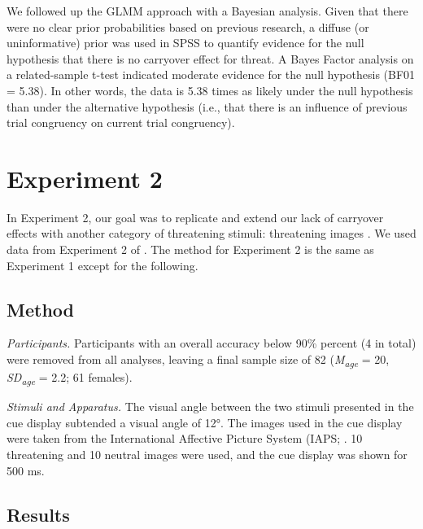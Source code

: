\documentclass{article}
\begin{document}
We followed up the GLMM approach with a Bayesian analysis. Given that there were no clear prior probabilities based on previous research, a diffuse (or uninformative) prior was used in SPSS to quantify evidence for the null hypothesis that there is no carryover effect for threat. A Bayes Factor analysis on a related-sample t-test indicated moderate evidence for the null hypothesis (BF01 = 5.38). In other words, the data is 5.38 times as likely under the null hypothesis than under the alternative hypothesis (i.e., that there is an influence of previous trial congruency on current trial congruency). 

\section{Experiment 2}

\textbf{}In Experiment 2, our goal was to replicate and extend our lack of carryover effects with another category of threatening stimuli: threatening images \parencite{Lang2008}. We used data from Experiment 2 of \parencite{Carlson2020}. The method for Experiment 2 is the same as Experiment 1 except for the following.

\subsection{Method}

\emph{Participants. }Participants with an overall accuracy below 90\% percent (4 in total) were removed from all analyses, leaving a final sample size of 82 (\emph{M}\textsubscript{\emph{age}} = 20, \emph{SD}\textsubscript{\emph{age}} = 2.2; 61 females). 

\emph{Stimuli and Apparatus. }The visual angle between the two stimuli presented in the cue display subtended a visual angle of 12°. The images used in the cue display were taken from the International Affective Picture System (IAPS; \parencite[200][]{Lang2008}. 10 threatening and 10 neutral images were used, and the cue display was shown for 500 ms. 

\subsection{Results}
\end{document}
